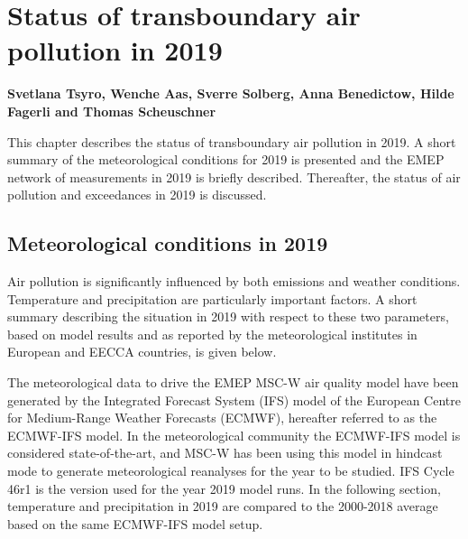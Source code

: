 \chapter[Status in 2019]{Status of transboundary air pollution in 2019}
\label{ch:chapterStatus}


{\bf{Svetlana Tsyro, Wenche Aas, Sverre Solberg, Anna Benedictow, Hilde Fagerli and Thomas Scheuschner}}
\vspace{30pt}

This chapter describes the status of transboundary air pollution in 2019. A short summary of the meteorological conditions for 2019 is presented and the EMEP network of measurements in 2019 is briefly described. Thereafter, the status of air pollution and exceedances in 2019 is discussed.

\section{Meteorological conditions in 2019}
\label{sec:meteo}
Air pollution is significantly influenced by both emissions and weather conditions. Temperature and precipitation are particularly important factors. A short summary describing the situation in 2019 with respect to these two parameters, based on model results and as reported by the meteorological institutes in European and EECCA countries, is given below.

The meteorological data to drive the EMEP MSC-W air quality model have been generated by the Integrated Forecast System (IFS) model of the European Centre for Medium-Range Weather Forecasts (ECMWF), hereafter referred to as the ECMWF-IFS model. In the meteorological community the ECMWF-IFS model is considered state-of-the-art, and MSC-W has been using this model in hindcast mode to generate meteorological reanalyses for the year to be studied. IFS Cycle 46r1 is the version used for the year 2019 model runs. In the following section, temperature and precipitation in 2019 are compared to the 2000-2018 average based on the same ECMWF-IFS model setup.

